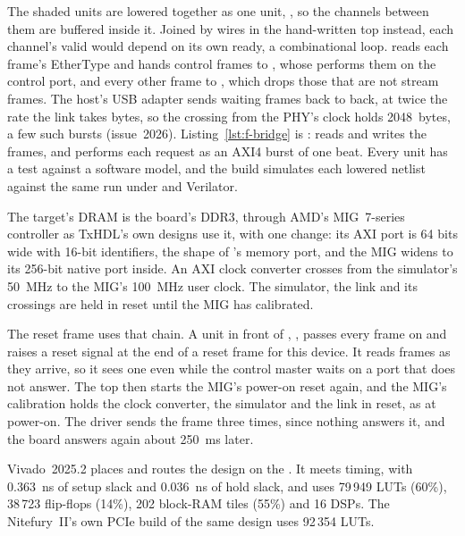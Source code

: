\documentclass[journal,9pt]{IEEEtran}
\newcommand{\streampart}[3]{%
}
\begin{document}
The shaded units are lowered together as one unit,
, so the channels between them are buffered inside
it. Joined by wires in the hand-written top instead, each channel's
valid would depend on its own ready, a combinational loop.
 reads each frame's EtherType and hands control frames
to , whose  performs them on the
control port, and every other frame to , which
drops those that are not stream frames. The host's USB adapter sends
waiting frames back to back, at twice the rate the link takes bytes,
so the crossing from the PHY's clock holds 2048~bytes, a few such
bursts (issue~2026).
Listing~\ref{lst:f-bridge} is : 
reads and writes the frames, and  performs each
request as an AXI4 burst of one beat. Every unit has a test against a
software model, and the build simulates each lowered netlist against
the same run under  and Verilator.

\streampart{streambridge}{\code{StreamBridge}: the frames on one side,
the 128-bit AXI4 port on the other.}{lst:f-bridge}

The target's DRAM is the board's DDR3, through AMD's MIG~7-series
controller as TxHDL's own designs use it, with one change: its AXI port
is 64 bits wide with 16-bit identifiers, the shape of 's
memory port, and the MIG widens to its 256-bit native port inside. An
AXI clock converter crosses from the simulator's 50~MHz to the MIG's
100~MHz user clock. The simulator, the link and its crossings are held
in reset until the MIG has calibrated.

The reset frame uses that chain. A unit in front of ,
, passes every frame on and raises a reset signal at the
end of a reset frame for this device. It reads frames as they arrive,
so it sees one even while the control master waits on a port that does
not answer. The top then starts the MIG's power-on reset again, and the
MIG's calibration holds the clock converter, the simulator and the link
in reset, as at power-on. The driver sends the frame three times,
since nothing answers it, and the board answers again about 250~ms
later.

Vivado~2025.2 places and routes the design on the
. It meets timing, with 0.363~ns of setup slack
and 0.036~ns of hold slack, and uses 79\,949 LUTs (60\%), 38\,723
flip-flops (14\%), 202 block-RAM tiles (55\%) and 16 DSPs. The
Nitefury~II's own PCIe build of the same design uses 92\,354 LUTs.
\end{document}
